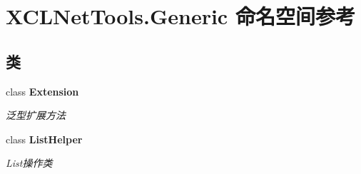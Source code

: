 \hypertarget{namespace_x_c_l_net_tools_1_1_generic}{}\section{X\+C\+L\+Net\+Tools.\+Generic 命名空间参考}
\label{namespace_x_c_l_net_tools_1_1_generic}
\subsection*{类}
\begin{DoxyCompactItemize}
\item 
class {\bfseries Extension}
\begin{DoxyCompactList}\small\item\em 泛型扩展方法 \end{DoxyCompactList}\item 
class {\bfseries List\+Helper}
\begin{DoxyCompactList}\small\item\em List操作类 \end{DoxyCompactList}\end{DoxyCompactItemize}
